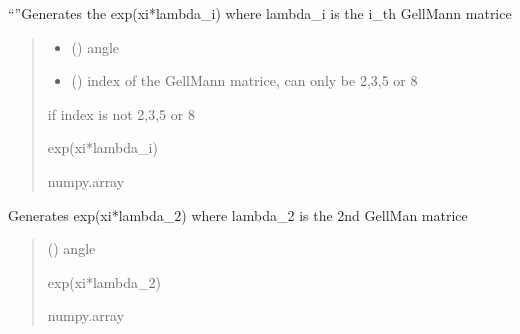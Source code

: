 \documentclass[letterpaper,10pt,english]{sphinxmanual}
\begin{document}
\begin{fulllineitems}
\label{\detokenize{gauge_su3:gauge_su3.el}}
\pysigstartsignatures
\pysiglinewithargsret
{}
{\sphinxparamcomma {}}
{}
\pysigstopsignatures
\sphinxAtStartPar
“”Generates the exp(xi*lambda\_i) where lambda\_i is the i\_th Gell\sphinxhyphen{}Mann matrice
\begin{quote}\begin{description}
\begin{itemize}
\item {} 
\sphinxAtStartPar
{} () \textendash{} angle

\item {} 
\sphinxAtStartPar
{} () \textendash{} index of the Gell\sphinxhyphen{}Mann matrice, can only be 2,3,5 or 8

\end{itemize}

\sphinxAtStartPar
{} \textendash{} if index is not 2,3,5 or 8

\sphinxAtStartPar
exp(xi*lambda\_i)

\sphinxAtStartPar
numpy.array

\end{description}\end{quote}

\end{fulllineitems}


\begin{fulllineitems}
\label{\detokenize{gauge_su3:gauge_su3.el_2}}
\pysigstartsignatures
\pysiglinewithargsret
{}
{}
{}
\pysigstopsignatures
\sphinxAtStartPar
Generates exp(xi*lambda\_2) where lambda\_2 is the 2nd Gell\sphinxhyphen{}Man matrice
\begin{quote}\begin{description}
\sphinxAtStartPar
{} () \textendash{} angle

\sphinxAtStartPar
exp(xi*lambda\_2)

\sphinxAtStartPar
numpy.array

\end{description}\end{quote}

\end{fulllineitems}
\end{document}
